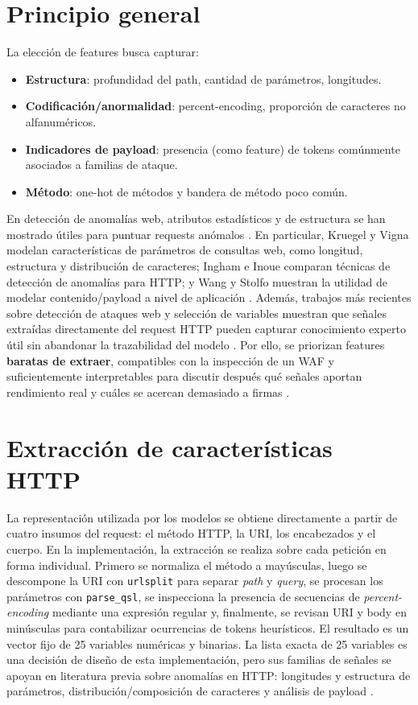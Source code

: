 \documentclass[12pt,oneside]{report}
\begin{document}
\section{Principio general}
La elección de features busca capturar:
\begin{itemize}[leftmargin=*]
  \item \textbf{Estructura}: profundidad del path, cantidad de parámetros, longitudes.
  \item \textbf{Codificación/anormalidad}: percent-encoding, proporción de caracteres no alfanuméricos.
  \item \textbf{Indicadores de payload}: presencia (como feature) de tokens comúnmente asociados a familias de ataque.
  \item \textbf{Método}: one-hot de métodos y bandera de método poco común.
\end{itemize}
En detección de anomalías web, atributos estadísticos y de estructura se han mostrado útiles para puntuar requests anómalos \cite{kruegel_vigna_2003}. En particular, Kruegel y Vigna modelan características de parámetros de consultas web, como longitud, estructura y distribución de caracteres; Ingham e Inoue comparan técnicas de detección de anomalías para HTTP; y Wang y Stolfo muestran la utilidad de modelar contenido/payload a nivel de aplicación \cite{kruegel_vigna_2003,ingham_inoue_2007,wang_stolfo_2004}. Además, trabajos más recientes sobre detección de ataques web y selección de variables muestran que señales extraídas directamente del request HTTP pueden capturar conocimiento experto útil sin abandonar la trazabilidad del modelo \cite{riverol_2024,srbh_paper}. Por ello, se priorizan features \textbf{baratas de extraer}, compatibles con la inspección de un WAF y suficientemente interpretables para discutir después qué señales aportan rendimiento real y cuáles se acercan demasiado a firmas \cite{owasp_waf,modsecurity_site}.


\section{Extracción de características HTTP}
La representación utilizada por los modelos se obtiene directamente a partir de cuatro insumos del request: el método HTTP, la URI, los encabezados y el cuerpo. En la implementación, la extracción se realiza sobre cada petición en forma individual. Primero se normaliza el método a mayúsculas, luego se descompone la URI con \texttt{urlsplit} para separar \textit{path} y \textit{query}, se procesan los parámetros con \texttt{parse\_qsl}, se inspecciona la presencia de secuencias de \textit{percent-encoding} mediante una expresión regular y, finalmente, se revisan URI y body en minúsculas para contabilizar ocurrencias de tokens heurísticos. El resultado es un vector fijo de 25 variables numéricas y binarias. La lista exacta de 25 variables es una decisión de diseño de esta implementación, pero sus familias de señales se apoyan en literatura previa sobre anomalías en HTTP: longitudes y estructura de parámetros, distribución/composición de caracteres y análisis de payload \cite{kruegel_vigna_2003,ingham_inoue_2007,wang_stolfo_2004}.
\end{document}

